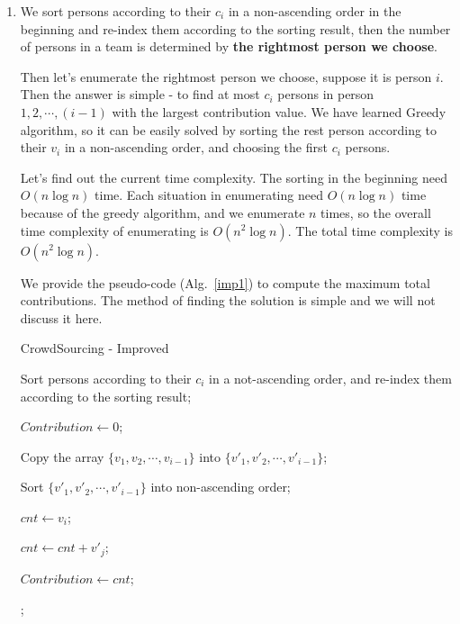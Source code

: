 \documentclass[12pt,a4paper]{article}
\makeatletter
\newtheorem*{solution}{Solution}
\theoremstyle{definition}
\renewenvironment{solution}[1][Solution] {\par\pushQED{\qed}\normalfont\topsep6\p@\@plus6\p@\relax\trivlist\item[\hskip\labelsep\bfseries#1\@addpunct{.}]\ignorespaces}{\popQED\endtrivlist\@endpefalse} \makeatother
\makeatother
\begin{document}
\begin{enumerate}
\begin{solution}
        We sort persons according to their $c_i$ in a non-ascending order in the beginning and re-index them according to the sorting result, then the number of persons in a team is determined by \textbf{the rightmost person we choose}.

        Then let's enumerate the rightmost person we choose, suppose it is person $i$. Then the answer is simple - to find at most $c_i$ persons in person $1,2,\cdots,(i-1)$ with the largest contribution value. We have learned Greedy algorithm, so it can be easily solved by sorting the rest person according to their $v_i$ in a non-ascending order, and choosing the first $c_i$ persons.

        Let's find out the current time complexity. The sorting in the beginning need $O(n\log{n})$ time. Each situation in enumerating need $O(n\log{n})$ time because of the greedy algorithm, and we enumerate $n$ times, so the overall time complexity of enumerating is $O(n^2 \log{n})$. The total time complexity is $O(n^2 \log{n})$.

        We provide the pseudo-code (Alg.~\ref{imp1}) to compute the maximum total contributions. The method of finding the solution is simple and we will not discuss it here.

        \begin{minipage}[t]{0.9\textwidth}
        \begin{algorithm}[H]

            \BlankLine
            \caption{CrowdSourcing - Improved}
            \label{imp1}
            Sort persons according to their $c_i$ in a not-ascending order, and re-index them according to the sorting result;

            $Contribution \leftarrow 0$;

             {
                Copy the array $\{v_1, v_2, \cdots, v_{i-1}\}$ into $\{v'_1, v'_2, \cdots, v'_{i-1}\}$;

                Sort $\{v'_1, v'_2, \cdots, v'_{i-1}\}$ into non-ascending order;

                $cnt \leftarrow v_i$;

                 {
                    $cnt \leftarrow cnt + v'_j$;
                }

                 {
                    $Contribution \leftarrow cnt$;
                }
            }
            ;
        \end{algorithm}
        \end{minipage}


\end{solution}
\end{enumerate}
\end{document}
